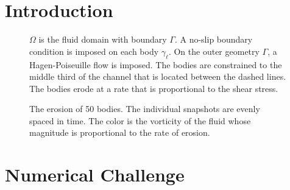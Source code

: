 \documentclass[portrait]{sciposter}
\begin{document}
\begin{multicols}{1}
\section*{Introduction}

\begin{figure}
	\centering
		
		\caption{$\Omega$ is the fluid domain with boundary $\Gamma$.  A no-slip boundary condition is imposed on each body $\gamma_\ell$.  On the outer geometry $\Gamma$, a Hagen-Poiseuille flow is imposed. The bodies are constrained to the middle third of the channel that is located between the dashed lines. The bodies erode at a rate that is proportional to the shear stress.}
\end{figure}

\begin{figure}[H]

\caption{\label{fig:Eroding50vort} The erosion of 50 bodies. The
individual snapshots are evenly spaced in time. The color is the vorticity of the fluid
whose magnitude is proportional to the rate of erosion.}
\end{figure}
\vspace{-20pt}
\section*{Numerical Challenge}
\begin{figure}[h]
\centering
        \begin{subfigure}[b]{0.46\textwidth}

                \caption{}
        \end{subfigure}%
        \begin{subfigure}[b]{0.55\textwidth}

                \caption{ }
        \end{subfigure}
        \begin{subfigure}[b]{0.48\textwidth}
            \center


\end{subfigure}
\end{figure}
\end{multicols}
\end{document}
